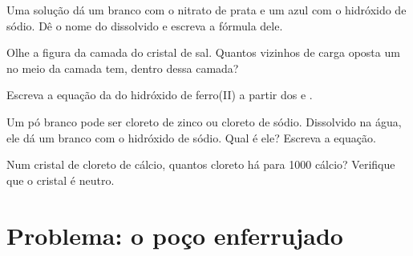 \begin{exercise}[$\star\star$]\label{exo:g9:ions:8}
Uma solução dá um  branco com o nitrato de prata e um azul
com o hidróxido de sódio. Dê o nome do  dissolvido e
escreva a fórmula dele.
\end{exercise}

\begin{exercise}[$\star\star$]\label{exo:g9:ions:9}
Olhe a figura da camada do cristal de sal. Quantos vizinhos de carga
oposta um  no meio da camada tem, dentro dessa camada?
\end{exercise}

\begin{exercise}[$\star\star$]\label{exo:g9:ions:10}
Escreva a equação da  do hidróxido de ferro(II) a partir dos
  e .
\end{exercise}

\begin{exercise}[$\star\star\star$]\label{exo:g9:ions:11}
Um pó branco pode ser cloreto de zinco ou cloreto de sódio. Dissolvido
na água, ele dá um  branco com o hidróxido de sódio. Qual é
ele? Escreva a equação.
\end{exercise}

\begin{exercise}[$\star\star\star$]\label{exo:g9:ions:12}
Num cristal de cloreto de cálcio, quantos  cloreto há para 1000
 cálcio? Verifique que o cristal é neutro.
\end{exercise}

\section{Problema: o poço enferrujado}


